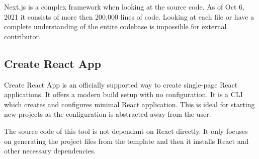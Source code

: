 Next.js is a complex framework when looking at the source code. As of Oct 6, 2021 it consists of
more then 200,000 lines of code. Looking at each file or have a complete understanding of the
entire codebase is impossible for external contributor.

\subsection{Create React App}
\label{intro-cra}

Create React App is an officially supported way to create single-page React applications. It offers
a modern build setup with no configuration. It is a CLI which creates and configures minimal React
application. This is ideal for starting new projects as the configuration is abstracted away from
the user.

The source code of this tool is not dependant on React directly. It only focuses on generating the
project files from the template and then it installs React and other necessary dependencies.
